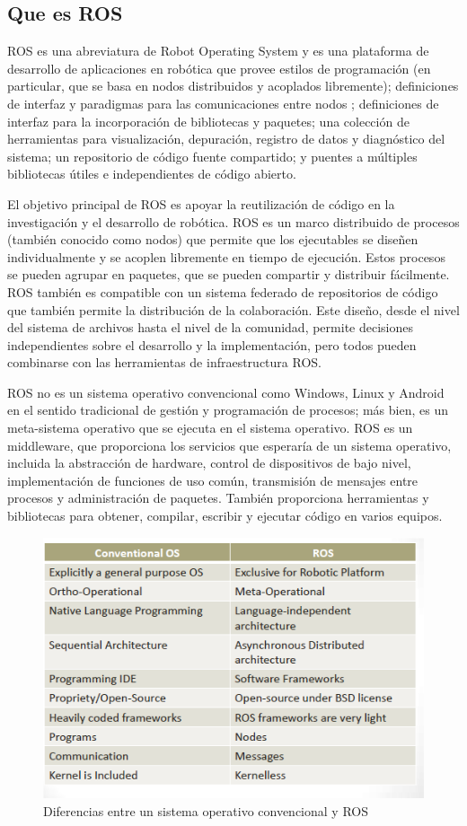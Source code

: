     \newpage


    \subsection{Que es ROS}
       ROS es una abreviatura de  Robot Operating System y es una plataforma de desarrollo de aplicaciones en robótica que provee estilos de programación (en particular, que se basa en nodos distribuidos y acoplados libremente); definiciones de interfaz y paradigmas para las comunicaciones entre nodos ; definiciones de interfaz para la incorporación de bibliotecas y paquetes; una colección de herramientas para visualización, depuración, registro de datos y diagnóstico del sistema; un repositorio de código fuente compartido; y puentes a múltiples bibliotecas útiles e independientes de código abierto.
       
       El objetivo principal de ROS es apoyar la reutilización de código en la investigación y el desarrollo de robótica. ROS es un marco distribuido de procesos (también conocido como nodos) que permite que los ejecutables se diseñen individualmente y se acoplen libremente en tiempo de ejecución. Estos procesos se pueden agrupar en paquetes, que se pueden compartir y distribuir fácilmente. ROS también es compatible con un sistema federado de repositorios de código que también permite la distribución de la colaboración. Este diseño, desde el nivel del sistema de archivos hasta el nivel de la comunidad, permite decisiones independientes sobre el desarrollo y la implementación, pero todos pueden combinarse con las herramientas de infraestructura ROS.
       
       ROS no es un sistema operativo convencional como Windows, Linux y Android en el sentido tradicional de gestión y programación de procesos; más bien, es un meta-sistema operativo que se ejecuta en el sistema operativo. ROS es un middleware, que proporciona los servicios que esperaría de un sistema operativo, incluida la abstracción de hardware, control de dispositivos de bajo nivel, implementación de funciones de uso común, transmisión de mensajes entre procesos y administración de paquetes. También proporciona herramientas y bibliotecas para obtener, compilar, escribir y ejecutar código en varios equipos.
       
        \begin{figure}[htb]
            \centering
            \includegraphics[width=0.6\linewidth]{Main/Chapter3/Images3/3-4/diferencia-ROS-SO.png}
            \caption{Diferencias entre un sistema operativo convencional y ROS}
            \label{f:Cap3-4_diferencias_ros_so}
        \end{figure}
        
